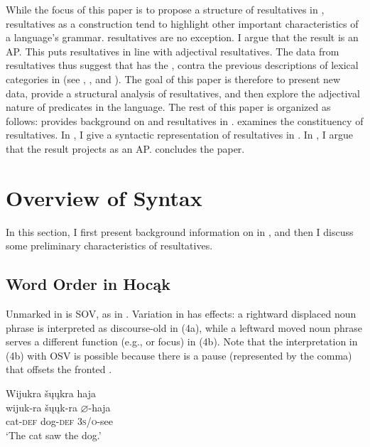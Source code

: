 \documentclass[output=paper]{LSP/langsci}
\begin{document}
While the focus of this paper is to propose a structure of resultatives in , resultatives as a construction tend to highlight other important characteristics of a language's grammar.  resultatives are no exception. I argue that the result  is an AP. This puts  resultatives in line with  adjectival resultatives. The data from resultatives
thus suggest that  has the  , contra the previous descriptions of lexical categories in  (see \citealt{Lipkind1945}, \citealt{Susman1943}, and \citealt{Helmbrecht2006b}). The goal of this paper is therefore to present new  data, provide a structural analysis of resultatives, and then explore the adjectival nature of  predicates in the language. The rest of this paper is organized as follows:  provides background on   and resultatives in .  examines the constituency of  resultatives. In , I give a syntactic representation of resultatives in . In , I argue that the result  projects as an AP.  concludes the paper.

\section{Overview of  Syntax}\label{sec:rosen:2}

In this section, I first present background information on  in , and then I discuss some preliminary characteristics of  resultatives.

\subsection{Word Order in Hocąk}

Unmarked  in  is SOV, as in . Variation in  has  effects: a rightward displaced noun phrase is interpreted as discourse-old in (4a), while a leftward moved noun phrase serves a different  function (e.g.,  or focus) in (4b). Note that the interpretation in (4b) with OSV  is possible because there is a pause (represented by the comma) that offsets the fronted .

\begin{exe}

\ex\label{ex:rosen:3} \glll Wijukra šųųkra haja \\
 wijuk-ra šųųk-ra {$\varnothing$}-haja\\
cat-\textsc{def} dog-\textsc{def} \textsc{3s/o}-see\\
\glt `The cat saw the dog.'

\end{exe}
\end{document}
